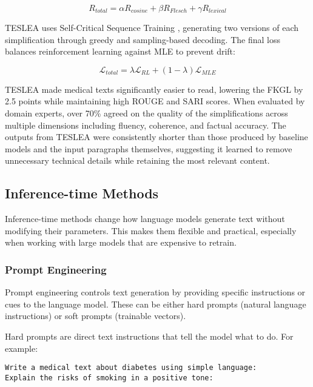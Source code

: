 \begin{equation}
    R_{total} = \alpha R_{cosine} + \beta R_{Flesch} + \gamma R_{lexical}
\end{equation}

TESLEA uses Self-Critical Sequence Training \cite{8099614}, generating two versions of each simplification through greedy and sampling-based decoding. The final loss balances reinforcement learning against MLE to prevent drift:

\begin{equation}
    \mathcal{L}_{total} = \lambda \mathcal{L}_{RL} + (1-\lambda)\mathcal{L}_{MLE}
\end{equation}

TESLEA made medical texts significantly easier to read, lowering the FKGL by 2.5 points while maintaining high ROUGE and SARI scores. 
When evaluated by domain experts, over 70\% agreed on the quality of the simplifications across multiple dimensions including fluency, coherence, and factual accuracy.
The outputs from TESLEA were consistently shorter than those produced by baseline models and the input paragraphs themselves, suggesting it learned to remove unnecessary technical details while retaining the most relevant content.

\subsection{Inference-time Methods}

Inference-time methods change how language models generate text without modifying their parameters. 
This makes them flexible and practical, especially when working with large models that are expensive to retrain. 

\subsubsection{Prompt Engineering}

Prompt engineering controls text generation by providing specific instructions or cues to the language model. These can be either hard prompts (natural language instructions) or soft prompts (trainable vectors).

Hard prompts are direct text instructions that tell the model what to do. For example:
\begin{verbatim}
Write a medical text about diabetes using simple language:
Explain the risks of smoking in a positive tone:
\end{verbatim}

